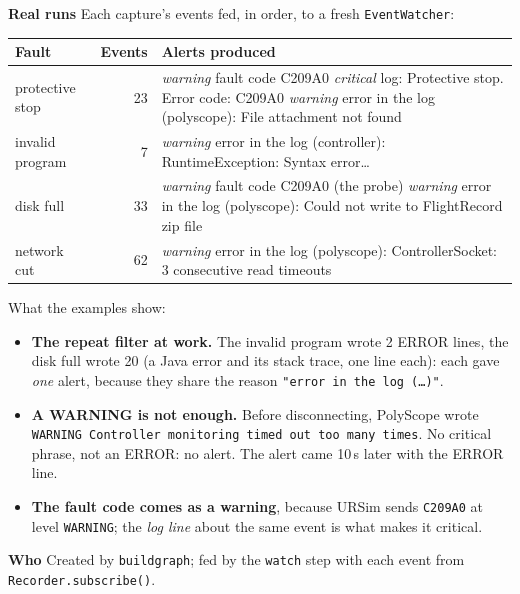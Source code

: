\documentclass[10pt]{article}
\newcommand{\brkus}{\textunderscore\allowbreak}
\newcommand{\f}[1]{\texttt{\let\_\brkus #1}}
\newcommand{\lbl}[1]{\par\smallskip\noindent\textbf{\color{accent}#1}\quad}
\begin{document}
\lbl{Real runs} Each capture's events fed, in order, to a fresh \f{EventWatcher}:
\begin{center}\footnotesize
\begin{tabularx}{\linewidth}{@{}l r X@{}}
\toprule
\textbf{Fault} & \textbf{Events} & \textbf{Alerts produced} \\
\midrule
protective stop & 23 & \emph{warning} fault code C209A0 \newline \emph{critical} log: Protective stop. Error code: C209A0 \newline \emph{warning} error in the log (polyscope): File attachment not found \\
invalid program & 7 & \emph{warning} error in the log (controller): RuntimeException: Syntax error\ldots \\
disk full & 33 & \emph{warning} fault code C209A0 (the probe) \newline \emph{warning} error in the log (polyscope): Could not write to FlightRecord zip file \\
network cut & 62 & \emph{warning} error in the log (polyscope): ControllerSocket: 3 consecutive read timeouts \\
\bottomrule
\end{tabularx}
\end{center}
What the examples show:
\begin{itemize}
\item \textbf{The repeat filter at work.} The invalid program wrote 2 ERROR lines, the disk full
wrote 20 (a Java error and its stack trace, one line each): each gave \emph{one} alert, because
they share the reason \f{"error in the log (\ldots)"}.
\item \textbf{A WARNING is not enough.} Before disconnecting, PolyScope wrote \f{WARNING
Controller monitoring timed out too many times}. No critical phrase, not an ERROR: no alert.
The alert came 10\,s later with the ERROR line.
\item \textbf{The fault code comes as a warning}, because URSim sends \f{C209A0} at level
\f{WARNING}; the \emph{log line} about the same event is what makes it critical.
\end{itemize}
\lbl{Who} Created by \f{build\_graph}; fed by the \f{watch} step with each event from
\f{Recorder.subscribe()}.
\end{document}
